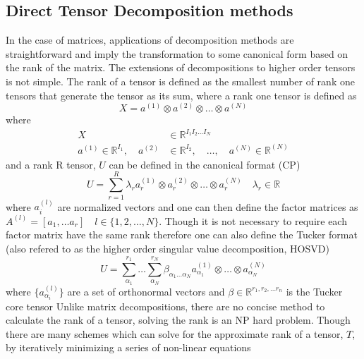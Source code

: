 	\subsection{Direct Tensor Decomposition methods}
		In the case of matrices, applications of decomposition methods are straightforward and imply the transformation to some canonical form based on the rank of the matrix.  The extensions of decompositions to higher order tensors is not simple.  The rank of a tensor is defined as the smallest number of rank one tensors that generate the tensor as its sum, where a rank one tensor is defined as
			\begin{equation}
				\mathit{X} = a^{(1)} \otimes a^{(2)} \otimes \dots \otimes a^{(N)}
			\end{equation}
		where
			\begin{equation}
				\begin{aligned}
					\mathit{X} &\in \mathbb{R}^{I_1I_2\dots I_N} \\
					a^{(1)} \in \mathbb{R}^{I_1}, \quad a^{(2)} &\in \mathbb{R}^{I_2}, \quad \dots, \quad a^{(N)} \in \mathbb{R}^{(N)}
				\end{aligned}
			\end{equation}
		and a rank R tensor, $\mathit{U}$ can be defined in the canonical format (CP)
			\begin{equation}
				\mathit{U} = \sum_{r=1}^R \lambda_r a^{(1)}_r \otimes a^{(2)}_r \otimes \dots \otimes a^{(N)}_r \quad \lambda_r \in \mathbb{R}
			\end{equation}
		where $a^{(l)}_i$ are normalized vectors and one can then define the factor matrices as $A^{(l)} = [a_1,\dots a_r]\quad l\in\{1,2,\dots,N\}$.  Though it is not necessary to require each factor matrix have the same rank therefore one can also define the Tucker format (also refered to as the higher order singular value decomposition, HOSVD)
			\begin{equation}
				\mathit{U} = \sum_{\alpha_1}^{r_1} \dots \sum_{\alpha_N}^{r_N} \beta_{\alpha_1\dots\alpha_N}a_{\alpha_1}^{(1)}\otimes \dots \otimes a_{\alpha_N}^{(N)}
			\end{equation}
		where $\{ a_{\alpha_i}^{(l)}\}$ are a set of orthonormal vectors and $\beta \in \mathbb{R}^{r_1,r_2,\dots r_n}$ is the Tucker core tensor
	  Unlike matrix decompositions, there are no concise method to calculate the rank of a tensor, solving the rank is an NP hard problem\cite{Hastad1990}.  Though there are many schemes which can solve for the approximate rank of a tensor, $\mathit{T}$, by iteratively minimizing a series of non-linear equations\cite{Kolda 2008}
